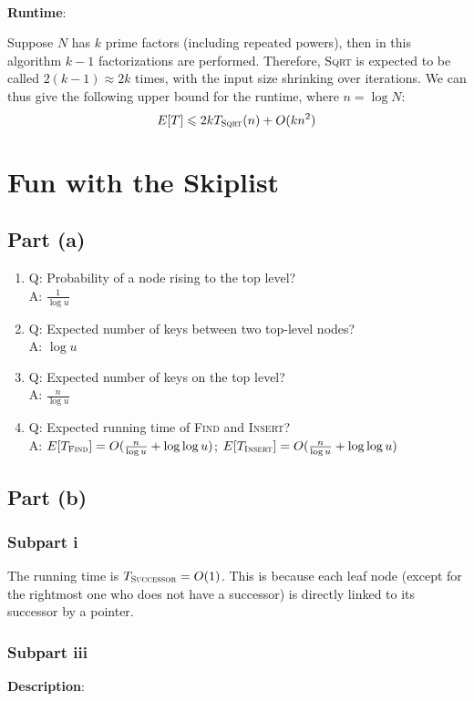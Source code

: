 \documentclass{article}
\begin{document}
~

\noindent\textbf{Runtime}:

Suppose $N$ has $k$ prime factors (including repeated powers), then in this algorithm $k-1$ factorizations are performed. Therefore, \textsc{Sqrt} is expected to be called $2(k-1)\approx2k$ times, with the input size shrinking over iterations. We can thus give the following upper bound for the runtime, where $n=\log N$:
\begin{equation*}
E[T]\leqslant2kT_{\textsc{Sqrt}}(n)+O(kn^2)
\end{equation*}

\section{Fun with the Skiplist}
\subsection{Part (a)}
\begin{enumerate}
\item{Q: Probability of a node rising to the top level?\\A: $\frac{1}{\log u}$}
\item{Q: Expected number of keys between two top-level nodes?\\A: $\log u$}
\item{Q: Expected number of keys on the top level?\\A: $\frac{n}{\log u}$}
\item{Q: Expected running time of \textsc{Find} and \textsc{Insert}?\\A: $E[T_{\textsc{Find}}]=O(\frac{n}{\log u}+\log\log u)$; $E[T_{\textsc{Insert}}]=O(\frac{n}{\log u}+\log\log u)$}
\end{enumerate}

\subsection{Part (b)}
\subsubsection{Subpart i}
The running time is $T_{\textsc{Successor}}=O(1)$. This is because each leaf node (except for the rightmost one who does not have a successor) is directly linked to its successor by a pointer.

\subsubsection{Subpart iii}
\noindent\textbf{Description}:
\end{document}
